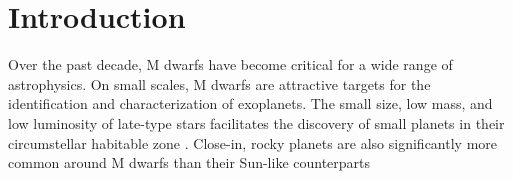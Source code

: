 \documentclass[twocolumn]{aastex62}
\begin{document}
\NewPageAfterKeywords




\section{Introduction}\label{sec:intro}
Over the past decade, M dwarfs have become critical for a wide range of astrophysics. On small scales, M dwarfs are attractive targets for the identification and characterization of exoplanets. The small size, low mass, and low luminosity of late-type stars facilitates the discovery of small planets \citep[e.g.][]{Muirhead2012,Martinez:2017aa,Mann:2018} in their circumstellar habitable zone \citep[e.g.,][]{Tarter2007,Shields:2016aa,Dittmann2017b}. Close-in, rocky planets are also significantly more common around M dwarfs than their Sun-like counterparts \citep{Dressing2013,2013PNAS..11019273P,Mulders2015,Gaidos2016b}
\end{document}
